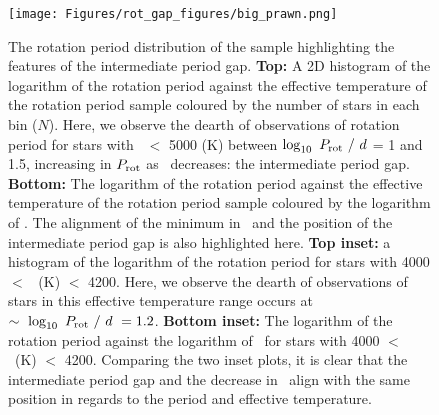 \begin{figure}
\centering
 \texttt{[image: Figures/rot\_gap\_figures/big\_prawn.png]}
 \caption[The rotation period distribution of the \citep{mcquillan_rotation_2014} sample highlighting the features of the intermediate period gap.]{The rotation period distribution of the \citep{mcquillan_rotation_2014} sample highlighting the features of the intermediate period gap. \textbf{Top:} A 2D histogram of the logarithm of the rotation period against the effective temperature of the rotation period sample coloured by the number of stars in each bin ($N$). Here, we observe the dearth of observations of rotation period for stars with \teff \ $<$ 5000 (K) between $\log_{10} \ P_{\rm{rot}}\ / \ d$ = 1 and 1.5, increasing in $P_{\rm{rot}}$ as \teff \ decreases: the intermediate period gap. \textbf{Bottom:} The logarithm of the rotation period against the effective temperature of the rotation period sample coloured by the logarithm of \rper{}. The alignment of the minimum in \rper\ and the position of the intermediate period gap is also highlighted here.  
 \textbf{Top inset:} a histogram of the logarithm of the rotation period for stars with 4000 $<$ \teff \ (K) $<$ 4200. Here, we observe the dearth of observations of stars in this effective temperature range occurs at $\sim \ \log_{10} \ P_{\rm{rot}}\ / \ d \ = 1.2$. 
 \textbf{Bottom inset:} The logarithm of the rotation period against the logarithm of \rper \ for stars with 4000 $<$ \teff \ (K) $<$ 4200. Comparing the two inset plots, it is clear that the intermediate period gap and the decrease in \rper \ align with the same position in regards to the period and effective temperature.}
 \label{fig:big_prawn}
\end{figure}


